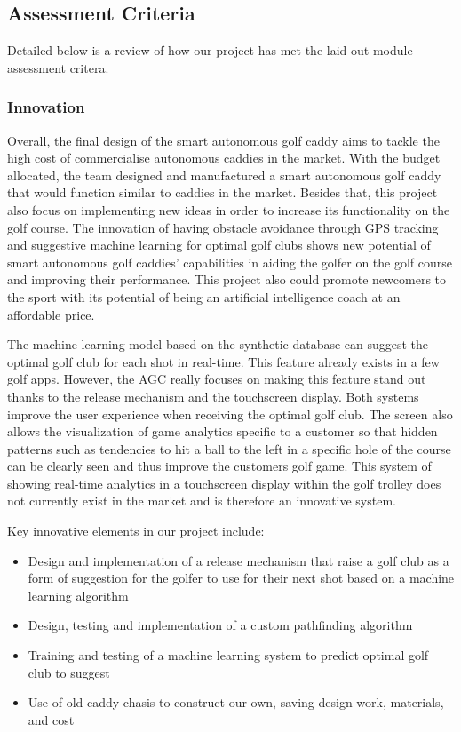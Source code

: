 \documentclass[11pt,landscape]{article}
\begin{document}
\begin{multicols}{3}
\subsection{Assessment Criteria}
Detailed below is a review of how our project has met the laid out module
assessment critera.
\subsubsection{Innovation}
Overall, the final design of the smart autonomous golf caddy aims to tackle the
high cost of commercialise autonomous caddies in the market. With the budget
allocated, the team designed and manufactured a smart autonomous golf caddy that
would function similar to caddies in the market. Besides that, this project also
focus on implementing new ideas in order to increase its functionality on the
golf course. The innovation of having obstacle avoidance through GPS tracking
and suggestive machine learning for optimal golf clubs shows new potential of
smart autonomous golf caddies' capabilities in aiding the golfer on the golf
course and improving their performance. This project also could promote
newcomers to the sport with its potential of being an artificial intelligence
coach at an affordable price.

The machine learning model based on the synthetic database can suggest the
optimal golf club for each shot in real-time. This feature already exists in a
few golf apps. However, the AGC really focuses on making this feature stand out
thanks to the release mechanism and the touchscreen display. Both systems
improve the user experience when receiving the optimal golf club. The screen
also allows the visualization of game analytics specific to a customer so that
hidden patterns such as tendencies to hit a ball to the left in a specific hole
of the course can be clearly seen and thus improve the customers golf game. This
system of showing real-time analytics in a touchscreen display within the golf
trolley does not currently exist in the market and is therefore an innovative
system.

Key innovative elements in our project include:
\begin{itemize}
    \item Design and implementation of a release mechanism that raise a golf
    club as a form of suggestion for the golfer to use for their next shot based
    on a machine learning algorithm
    \item Design, testing and implementation of a custom pathfinding algorithm
    \item Training and testing of a machine learning system to predict optimal
    golf club to suggest
    \item Use of old caddy chasis to construct our own, saving design work,
    materials, and cost
\end{itemize}


\end{multicols}
\end{document}
